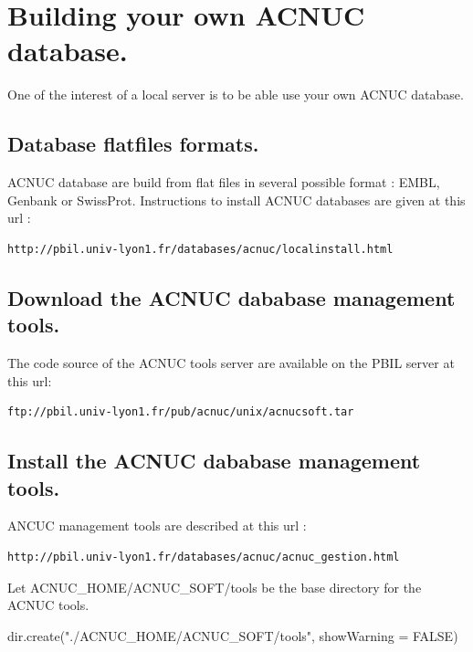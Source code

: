 \documentclass{article}
\begin{document}
\section{Building your own  ACNUC database.}

One of the interest of a local server is to be able use your own ACNUC
database.


\subsection{Database flatfiles formats.}

ACNUC database are build from flat files in several possible format : EMBL, Genbank or
SwissProt. Instructions to install ACNUC databases are given at this url :
\begin{verbatim}
http://pbil.univ-lyon1.fr/databases/acnuc/localinstall.html
\end{verbatim}


\subsection{Download the ACNUC dababase management tools.}
 
 
 
 
 The code source of the ACNUC tools server are available on the PBIL server  at this url:
\begin{verbatim}
ftp://pbil.univ-lyon1.fr/pub/acnuc/unix/acnucsoft.tar
\end{verbatim}

\subsection{Install the ACNUC dababase management tools.}
ANCUC management tools are described at this url :
\begin{verbatim}
http://pbil.univ-lyon1.fr/databases/acnuc/acnuc_gestion.html
\end{verbatim}

Let ACNUC\_HOME/ACNUC\_SOFT/tools be the base directory for the ACNUC tools.


\begin{Schunk}
\begin{Sinput}
 dir.create("./ACNUC_HOME/ACNUC_SOFT/tools", showWarning = FALSE)
\end{Sinput}
\end{Schunk}
\end{document}
